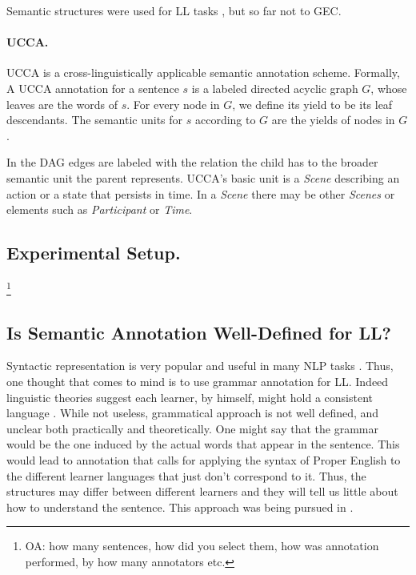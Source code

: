\documentclass[english]{article}
\newcommand{\oa}[1]{\footnote{\color{red}OA: #1}}
\begin{document}
Semantic structures were used for LL tasks \cite{king2013shallow}, but so
far not to GEC.

\paragraph{UCCA.} UCCA \cite{abend2013universal} is a cross-linguistically applicable semantic annotation scheme. Formally, 
A UCCA annotation for a sentence $s$ is a labeled directed acyclic graph $G$, whose
leaves are the words of $s$. For every node in $G$,
we define its yield to be its leaf descendants. The
semantic units for $s$ according to $G$ are the yields
of nodes in $G$.

 In the DAG edges are labeled with the relation the child has to the broader semantic unit the parent represents. UCCA's basic unit is a \textit{Scene} describing an action or a state that persists in time. In a \textit{Scene} there may be other \textit{Scenes} or elements such as \textit{Participant} or \textit{Time}. 


\subsection{Experimental Setup.}

\oa{how many sentences, how did you select them,
  how was annotation performed, by how many annotators etc.}


\subsection{Is Semantic Annotation Well-Defined for LL?}

Syntactic representation is very popular and useful in many NLP tasks 
\cite{mesfar2007named,ng2002improving,zollmann2006syntax}.
Thus, one thought that comes to mind is to use grammar annotation 
for LL. Indeed linguistic theories suggest each learner, by himself,
might hold a consistent 
language \cite{huebner1985system,tarone1983variability}.
While not useless, grammatical approach is not well
defined, and unclear both practically and theoretically. One might
say that the grammar would be the one induced by the actual words
that appear in the sentence. This would lead to annotation that calls
for applying the syntax of Proper English to the different learner
languages that just don't correspond to it. Thus, the structures may
differ between different learners and they will tell us little about
how to understand the sentence. This approach was being pursued in
\cite{berzak2016universal,ragheb2012defining}. 
\end{document}
